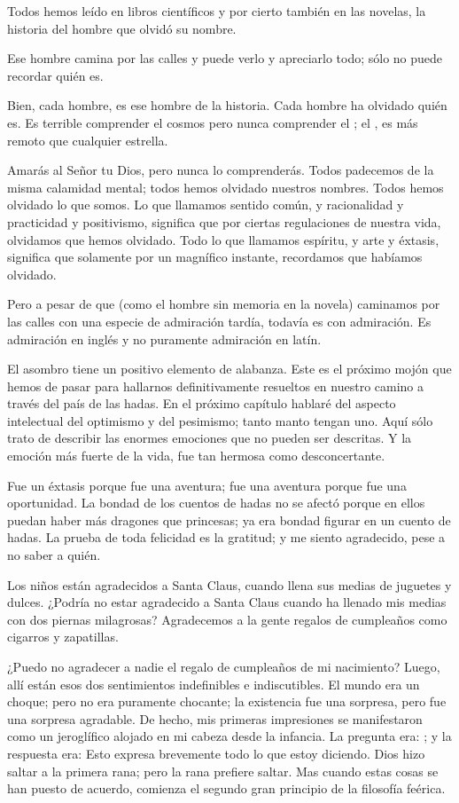 Todos hemos leído en libros científicos y por cierto también en las novelas, la historia del hombre
que olvidó su nombre.

Ese hombre camina por las calles y puede verlo y apreciarlo todo; sólo no puede recordar quién es.

Bien, cada hombre, es ese hombre de la historia. Cada hombre ha olvidado quién es. Es terrible
comprender el cosmos pero nunca comprender el ; el , es más remoto que cualquier estrella.

Amarás al Señor tu Dios, pero nunca lo comprenderás. Todos padecemos de la misma calamidad mental;
todos hemos olvidado nuestros nombres. Todos hemos olvidado lo que somos. Lo que llamamos sentido
común, y racionalidad y practicidad y positivismo, significa que por ciertas regulaciones de nuestra vida,
olvidamos que hemos olvidado. Todo lo que llamamos espíritu, y arte y éxtasis, significa que solamente
por un magnífico instante, recordamos que habíamos olvidado.

Pero a pesar de que (como el hombre sin memoria en la novela) caminamos por las calles con una
especie de admiración tardía, todavía es con admiración. Es admiración en inglés y no puramente
admiración en latín.

El asombro tiene un positivo elemento de alabanza. Este es el próximo mojón que hemos de pasar
para hallarnos definitivamente resueltos en nuestro camino a través del país de las hadas. En el próximo
capítulo hablaré del aspecto intelectual del optimismo y del pesimismo; tanto manto tengan uno. Aquí
sólo trato de describir las enormes emociones que no pueden ser descritas. Y la emoción más fuerte de la
vida, fue tan hermosa como desconcertante.

Fue un éxtasis porque fue una aventura; fue una aventura porque fue una oportunidad. La bondad de
los cuentos de hadas no se afectó porque en ellos puedan haber más dragones que princesas; ya era
bondad figurar en un cuento de hadas. La prueba de toda felicidad es la gratitud; y me siento agradecido,
pese a no saber a quién.

Los niños están agradecidos a Santa Claus, cuando llena sus medias de juguetes y dulces. ¿Podría
no estar agradecido a Santa Claus cuando ha llenado mis medias con dos piernas milagrosas?
Agradecemos a la gente regalos de cumpleaños como cigarros y zapatillas.

¿Puedo no agradecer a nadie el regalo de cumpleaños de mi nacimiento?
Luego, allí están esos dos sentimientos indefinibles e indiscutibles. El mundo era un choque; pero
no era puramente chocante; la existencia fue una sorpresa, pero fue una sorpresa agradable. De hecho, mis
primeras impresiones se manifestaron como un jeroglífico alojado en mi cabeza desde la infancia. La
pregunta era: ; y la respuesta era:  Esto
expresa brevemente todo lo que estoy diciendo. Dios hizo saltar a la primera rana; pero la rana prefiere
saltar. Mas cuando estas cosas se han puesto de acuerdo, comienza el segundo gran principio de la
filosofía feérica.

